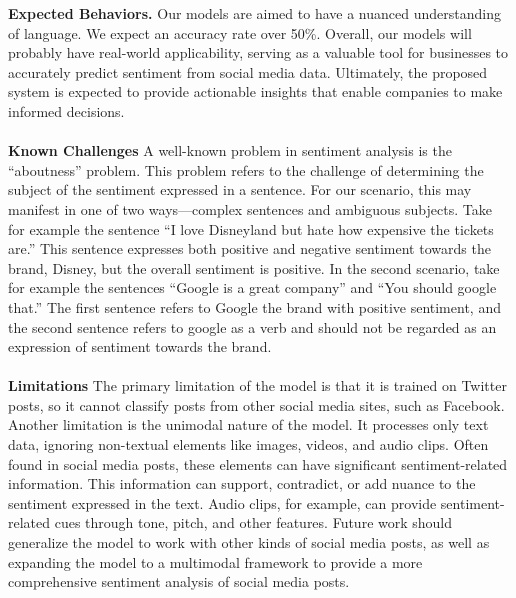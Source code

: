 \documentclass{article}
\begin{document}
\textbf{Expected Behaviors.} Our models are aimed to have a nuanced understanding of language. We expect an accuracy rate over 50\%. Overall, our models will probably have real-world applicability, serving as a valuable tool for businesses to accurately predict sentiment from social media data. Ultimately, the proposed system is expected to provide actionable insights that enable companies to make informed decisions.\\
\\
\textbf{Known Challenges} A well-known problem in sentiment analysis is the ``aboutness'' problem. This problem refers to the challenge of determining the subject of the sentiment expressed in a sentence. For our scenario, this may manifest in one of two ways---complex sentences and ambiguous subjects. Take for example the sentence ``I love Disneyland but hate how expensive the tickets are.'' This sentence expresses both positive and negative sentiment towards the brand, Disney, but the overall sentiment is positive. In the second scenario, take for example the sentences ``Google is a great company'' and ``You should google that.'' The first sentence refers to Google the brand with positive sentiment, and the second sentence refers to google as a verb and should not be regarded as an expression of sentiment towards the brand. \\
\\
\textbf{Limitations} The primary limitation of the model is that it is trained on Twitter posts, so it cannot classify posts from other social media sites, such as Facebook. Another limitation is the unimodal nature of the model. It processes only text data, ignoring non-textual elements like images, videos, and audio clips. Often found in social media posts, these elements can have significant sentiment-related information. This information can support, contradict, or add nuance to the sentiment expressed in the text. Audio clips, for example, can provide sentiment-related cues through tone, pitch, and other features. Future work should generalize the model to work with other kinds of social media posts, as well as expanding the model to a multimodal framework to provide a more comprehensive sentiment analysis of social media posts.

\newpage

\thispagestyle{empty}

\printbibliography
\end{document}
